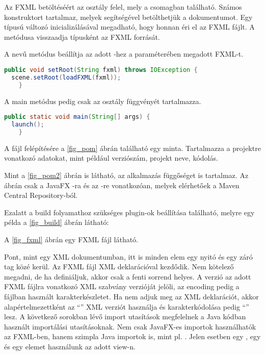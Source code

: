 Az FXML betöltéséért az  osztály felel, mely a  csomagban található.
Számos konstruktort tartalmaz, melyek segítségével betölthetjük a dokumentumot.
Egy  típusú változó inicializálásával megadható, hogy honnan éri el az FXML fájlt.
A  metódusa visszaadja  típusként az FXML forrását.

A  nevű metódus beállítja az adott -hez a paraméterében megadott FXML-t.

\begin{lstlisting}[language=Java]
public void setRoot(String fxml) throws IOException {
  scene.setRoot(loadFXML(fxml));
    }
\end{lstlisting}
 

A main metódus pedig csak az  osztály  függvényét tartalmazza. 

\begin{lstlisting}[language=Java]
public static void main(String[] args) {
  launch();
    }
\end{lstlisting}

A  fájl felépítésére a \ref{fig_pom} ábrán található egy minta.
Tartalmazza a projektre vonatkozó adatokat, mint például verziószám, projekt neve, kódolás. 
 

 
Mint a \ref{fig_pom2} ábrán is látható, az alkalmazás függőséget is tartalmaz.
Az ábrán csak a JavaFX -ra és az -re vonatkozóan, melyek elérhetőek a Maven Central Repository-ból. 
  

Ezalatt a build folyamathoz szükséges plugin-ok beállítása található, melyre egy példa a \ref{fig_build} ábrán látható: 




A \ref{fig_fxml} ábrán egy FXML fájl látható.

 
Pont, mint egy XML dokumentumban, itt is minden elem egy nyitó és egy záró tag közé kerül.
Az FXML fájl XML deklarációval kezdődik.
Nem kötelező megadni, de ha definiáljuk, akkor csak a fenti sorrend helyes.
A verzió az adott FXML fájlra vonatkozó XML szabvány verzióját jelöli, az encoding pedig a fájlban használt karakterkészletet.
Ha nem adjuk meg az XML deklarációt, akkor alapértelmezettként az “” XML verziót használja és karakterkódolása pedig “” lesz.
A következő sorokban lévő import utasítások megfelelnek a Java kódban használt importálási utasításoknak.
Nem csak JavaFX-es importok használhatók az FXML-ben, hanem szimpla Java importok is, mint pl. .
Jelen esetben egy , egy  és egy  elemet használunk az adott view-n. 
 
